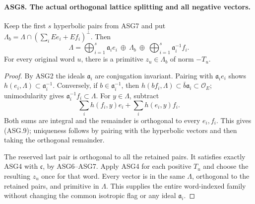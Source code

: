 \paragraph{ASG8. The actual orthogonal lattice splitting and all negative vectors.}
\label{claim:ASG8}
Keep the first \(s\) hyperbolic pairs from ASG7 and put
\(\Lambda_b=\Lambda\cap(\sum_i Ee_i+Ef_i)^\perp\).
Then
\[
 \Lambda=\bigoplus_{i=1}^{s}\mathfrak a_i e_i
              \ \oplus\ \Lambda_b
              \ \oplus\ \bigoplus_{i=1}^{s}\mathfrak a_i^{-1}f_i.
\tag{ASG.9}
\]
For every original word \(u\), there is a primitive
\(z_u\in\Lambda_b\) of norm \(-T_u\).
\begin{proof}
By ASG2 the ideals \(\mathfrak a_i\) are conjugation invariant.
Pairing with \(\mathfrak a_i e_i\) shows
\(h(e_i,\Lambda)\subset\mathfrak a_i^{-1}\).
Conversely, if \(b\in\mathfrak a_i^{-1}\), then
\(h(bf_i,\Lambda)\subset\bar b\mathfrak a_i\subset\mathcal O_E\);
unimodularity gives \(\mathfrak a_i^{-1}f_i\subset\Lambda\).
For \(y\in\Lambda\), subtract
\[
            \sum_i h(f_i,y)e_i+\sum_i h(e_i,y)f_i.
\]
Both sums are integral and the remainder is orthogonal to every
\(e_i,f_i\).  This gives (ASG.9); uniqueness follows by pairing
with the hyperbolic vectors and then taking the orthogonal remainder.

The reserved last pair is orthogonal to all the retained pairs.
It satisfies exactly ASG4 with \(\mathfrak c\), by ASG6--ASG7.
Apply ASG4 for each positive \(T_u\) and choose the resulting
\(z_u\) once for that word.  Every vector is in the same
\(\Lambda\), orthogonal to the retained pairs, and primitive in
\(\Lambda\).  This supplies the entire word-indexed family without
changing the common isotropic flag or any ideal \(\mathfrak a_i\).
\end{proof}

